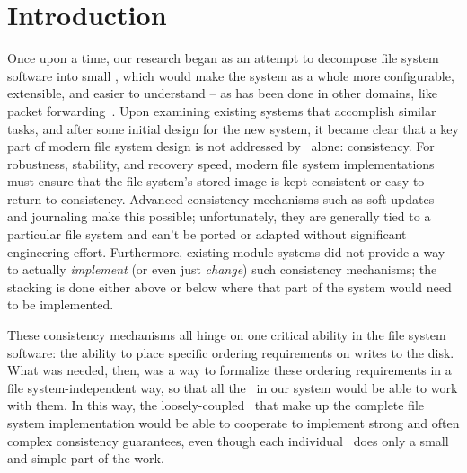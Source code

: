 \section {Introduction}
\label{sec:intro}

Once upon a time, our research began as an attempt to decompose file system
software into small \modules, which would make the system as a whole more
configurable, extensible, and easier to understand -- as has been done in other
domains, like packet forwarding~\cite{kohler00click}. Upon examining existing
systems that accomplish similar tasks, and after some initial design for the new
system, it became clear that a key part of modern file system design is not
addressed by \modules\ alone: consistency. For robustness, stability, and
recovery speed, modern file system implementations must ensure that the file
system's stored image is kept consistent or easy to return to consistency.
Advanced consistency mechanisms such as soft updates~\cite{ganger00soft} and
journaling make this possible; unfortunately, they are generally tied to a
particular file system and can't be ported or adapted without significant
engineering effort. Furthermore, existing module systems did not provide a way
to actually \emph{implement} (or even just \emph{change}) such consistency
mechanisms; the stacking is done either above or below where that part of the
system would need to be implemented.

These consistency mechanisms all hinge on one critical ability in the file
system software: the ability to place specific ordering requirements on writes
to the disk. What was needed, then, was a way to formalize these ordering
requirements in a file system-independent way, so that all the \modules\ in our
system would be able to work with them. In this way, the loosely-coupled
\modules\ that make up the complete file system implementation would be able to
cooperate to implement strong and often complex consistency guarantees, even
though each individual \module\ does only a small and simple part of the work.


